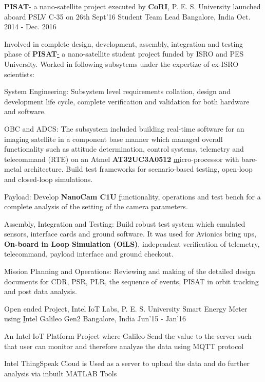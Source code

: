 
\begin{cventries}
	\cventry
	{\textbf{PISAT}\href{http://pisat.pes.edu/}- a nano-satellite project executed by \textbf{CoRI}\href{http://cori.pes.edu/}, P. E. S. University launched aboard PSLV C-35 on 26th Sept'16}
	{Student Team Lead}
	{Bangalore, India}
	{Oct. 2014 - Dec. 2016}
	{
		\begin{cvitems}
		\item{Involved in complete design, development, assembly, integration and testing phase of \textbf{PISAT}\href{https://www.isro.gov.in/Spacecraft/pisat} - a nano-satellite student project funded by ISRO and PES University. Worked in following subsytems under the expertize of ex-ISRO scientists:}
		\item{System Engineering: Subsystem level requirements collation, design and development life cycle, complete verification and validation for both hardware and software.}
		\item{OBC and ADCS: The subsystem included building real-time software for an imaging satellite in a component base manner which managed overall functionality such as attitude determination, control systems, telemetry and telecommand (RTE) on an Atmel \textbf{AT32UC3A0512 }\href{https://www.microchip.com/wwwproducts/en/AT32UC3A0512} micro-processor with bare-metal architecture. Build test frameworks for scenario-based testing, open-loop and closed-loop simulations.}
		\item{Payload: Develop \textbf{NanoCam C1U }\href{https://gomspace.com/UserFiles/Subsystems/datasheet/gs-ds-nanocam-c1u-17.pdf} functionality, operations and test bench for a complete analysis of the setting of the camera parameters.}
		\item{Assembly, Integration and Testing: Build robust test system which emulated sensors, interface cards and ground software. It was used for Avionics bring ups, \textbf{On-board in Loop Simulation (OiLS)}, independent verification of telemetry, telecommand, payload interface and ground checkout.}
		\item{Mission Planning and Operations: Reviewing and making of the detailed design documents for CDR, PSR, PLR, the sequence of events, PISAT in orbit tracking and post data analysis.}
		\end{cvitems}
	}
\end{cventries}
\begin{cventries}
	\cventry
	{Open ended Project, Intel IoT Labs, P. E. S. University}
	{Smart Energy Meter using \href{https://www.arduino.cc/en/ArduinoCertified/IntelGalileoGen2}Intel Galileo Gen2}
	{Bangalore, India}
	{Jun'15 - Jan'16}
	{
		\begin{cvitems}
		\item{An Intel IoT Platform Project where Galileo Send the value to the server such that user can monitor and therefore analyze the data using MQTT protocol}
		\item{Intel ThingSpeak Cloud is Used as a server to upload the data and do further analysis via inbuilt MATLAB Tools}
		\end{cvitems}
	}
\end{cventries}
